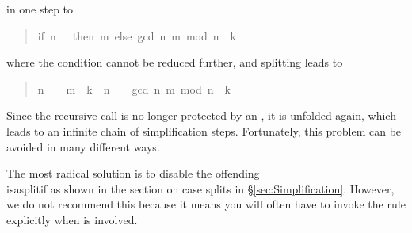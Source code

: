 \begin{isabellebody}
\begin{isamarkuptext}
\begin{quote}
\end{quote}
in one step to
\begin{quote}

\begin{isabelle}%
{\isacharparenleft}if\ \mbox{n}\ {\isacharequal}\ \ then\ \mbox{m}\ else\ gcd\ {\isacharparenleft}\mbox{n}{\isacharcomma}\ \mbox{m}\ mod\ \mbox{n}{\isacharparenright}{\isacharparenright}\ {\isacharequal}\ \mbox{k}
\end{isabelle}%

\end{quote}
where the condition cannot be reduced further, and splitting leads to
\begin{quote}

\begin{isabelle}%
{\isacharparenleft}\mbox{n}\ {\isacharequal}\ \ {\isasymlongrightarrow}\ \mbox{m}\ {\isacharequal}\ \mbox{k}{\isacharparenright}\ {\isasymand}\ {\isacharparenleft}\mbox{n}\ {\isasymnoteq}\ \ {\isasymlongrightarrow}\ gcd\ {\isacharparenleft}\mbox{n}{\isacharcomma}\ \mbox{m}\ mod\ \mbox{n}{\isacharparenright}\ {\isacharequal}\ \mbox{k}{\isacharparenright}
\end{isabelle}%

\end{quote}
Since the recursive call  is no longer protected by
an , it is unfolded again, which leads to an infinite chain of
simplification steps. Fortunately, this problem can be avoided in many
different ways.

The most radical solution is to disable the offending \\isa{split{\isacharunderscore}if} as
shown in the section on case splits in \S\ref{sec:Simplification}.  However,
we do not recommend this because it means you will often have to invoke the
rule explicitly when  is involved.


\end{isamarkuptext}
\end{isabellebody}
